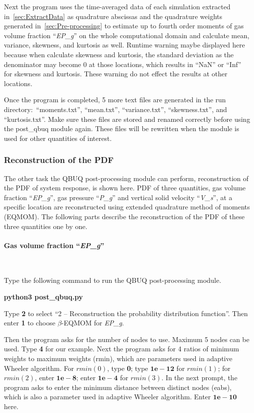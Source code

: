 \documentclass[a4paper,12pt,titlepage]{article}
\begin{document}
Next the program uses the time-averaged data of each simulation extracted 
in~\ref{sec:ExtractData} as quadrature abscissas and the quadrature weights 
generated in~\ref{sec:Pre-processing} to estimate up to fourth order moments of 
gas volume fraction ``\emph{EP\_g}'' on the whole computational domain and 
calculate mean, variance, skewness, and kurtosis as well. Runtime warning maybe
displayed here because when calculate skewness and kurtosis, the standard
deviation as the denominator may become 0 at those locations, which results in 
``NaN'' or ``Inf'' for skewness and kurtosis. These warning do not effect the 
results at other locations. 

Once the program is completed, 5 more text files are
generated in the run directory:\ ``moments.txt'', ``mean.txt'', 
``variance.txt'', ``skewness.txt'', and ``kurtosis.txt''. Make sure these files 
are stored and renamed correctly before using the post\_qbuq module again. 
These files will be rewritten when the module is used for other quantities of 
interest.

\subsubsection{Reconstruction of the PDF}
\label{sec:Reconstruction}

The other task the QBUQ post-processing module can perform, reconstruction of 
the PDF of system response, is shown here. PDF of three quantities, gas
volume fraction ``\emph{EP\_g}'', gas pressure ``\emph{P\_g}'' and vertical
solid velocity ``\emph{V\_s}'', at a specific location are reconstructed using
extended quadrature method of moments 
(EQMOM)\cite{Chalons2010,YuanLaurentFox2011}. 
The following parts describe the reconstruction of the PDF of these three 
quantities one by one.

\paragraph{Gas volume fraction ``\emph{EP\_g}''}\mbox{}\\
\label{sec:ReconEPg}

Type the following command to run the QBUQ post-processing module.

\textbf{python3 post\_qbuq.py}

Type \textbf{2} to select ``2 -- Reconstruction the probability distribution
function''. Then enter \textbf{1} to choose $\beta$-EQMOM for \emph{EP\_g}.

Then the program asks for the number of nodes to use. Maximum 5 nodes can be 
used. Type \textbf{4} for our example. Next the program asks for 4 ratios of 
minimum weights to maximum weights (rmin), which are parameters used in adaptive
Wheeler algorithm\cite{YuanFox2011}. For $rmin(0)$, type \textbf{0}; type 
$\mathbf{1e-12}$ for $rmin(1)$; for $rmin(2)$, enter $\mathbf{1e-8}$; enter 
$\mathbf{1e-4}$ for $rmin(3)$. In the next prompt, the program asks to enter the
minimum distance between distinct nodes (eabs), which is also a parameter used 
in adaptive Wheeler algorithm\cite{YuanFox2011}. Enter $\mathbf{1e-10}$ here.
\end{document}
